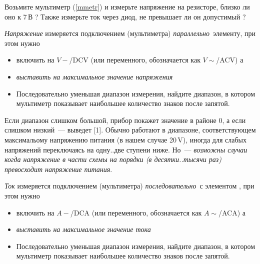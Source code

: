 
Возьмите мультиметр (\ref{mmetr}) и измерьте напряжение на резисторе, близко ли
оно к 7\,В ? Также измерьте ток через диод, не превышает ли он допустимый ?

\begin{framed}
\emph{Напряжение} измеряется  подключением
 (мультиметра) \emph{параллельно}\ элементу, при этом нужно
\begin{itemize}
\item
{} включить на
 $V-$/DCV (или переменного,
обозначается как $V\sim$/ACV) а
  \item {} \emph{выставить на максимальное значение напряжения}
\item
Последовательно уменьшая диапазон измерения, найдите диапазон, в котором
мультиметр показывает наибольшее количество знаков после запятой.
\end{itemize}
\end{framed}

Если диапазон
слишком большой, прибор покажет значение в районе 0, а если слишком низкий\ ---
выведет [1]. Обычно работают в диапазоне, соответствующем максимальому
напряжению питания (в нашем случае 20\,V), иногда для
слабых напряжений переключаясь на одну..две ступени ниже. Но\ ---
\emph{возможны случаи когда напряжение в части схемы на порядки (в десятки..тысячи
раз) превосходит напряжение питания}.

\begin{framed}
\emph{Ток} измеряется  подключением  (мультиметра) \emph{последовательно}\ с элементом , при этом
нужно
\begin{itemize}
\item
{} включить на
 $A-$/DCA (или переменного, обозначается
как $A\sim$/ACA) а
  \item {} \emph{выставить на максимальное значение тока}
\item
Последовательно уменьшая диапазон измерения, найдите диапазон, в котором
мультиметр показывает наибольшее количество знаков после запятой.
\end{itemize}
\end{framed}

